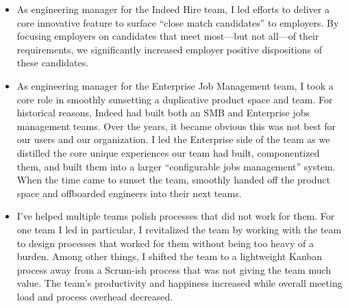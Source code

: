 \documentclass[11pt]{amsart}
\begin{document}
\begin{tcolorbox}[
	title=Software Engineering Manager \textcolor{DarkGray}{/} Indeed,
	after title={\hfill2019 \textcolor{DarkGray}{$\rightarrow$} Present \textcolor{DarkGray}{(5 years)}}
]
\begin{itemize}[noitemsep, leftmargin=2em, label=\raisebox{0.25ex}{\tiny$\bullet$}]
	\item As engineering manager for the Indeed Hire team, I led efforts to deliver a core innovative feature to surface ``close match candidates'' to employers. By focusing employers on candidates that meet most—but not all—of their requirements, we significantly increased employer positive dispositions of these candidates.
	\item As engineering manager for the Enterprise Job Management team, I took a core role in smoothly sunsetting a duplicative product space and team. For historical reasons, Indeed had built both an SMB and Enterprise jobs management teams. Over the years, it became obvious this was not best for our users and our organization. I led the Enterprise side of the team as we distilled the core unique experiences our team had built, componentized them, and built them into a larger ``configurable jobs management'' system. When the time came to sunset the team, smoothly handed off the product space and offboarded engineers into their next teams.
	\item I've helped multiple teams polish processes that did not work for them. For one team I led in particular, I revitalized the team by working with the team to design processes that worked for them without being too heavy of a burden. Among other things, I shifted the team to a lightweight Kanban process away from a Scrum-ish process that was not giving the team much value. The team's productivity and happiness increased while overall meeting load and process overhead decreased. %
\end{itemize}

\end{tcolorbox}
\end{document}
